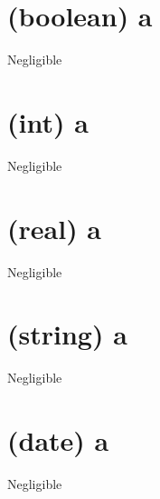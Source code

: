 \documentclass[12pt]{article}
\begin{document}
	\section{(boolean) a}
	Negligible
	
	\section{(int) a}
	Negligible
	
	\section{(real) a}
	Negligible
	
	\section{(string) a}
	Negligible
	
	\section{(date) a}
	Negligible
\end{document}
